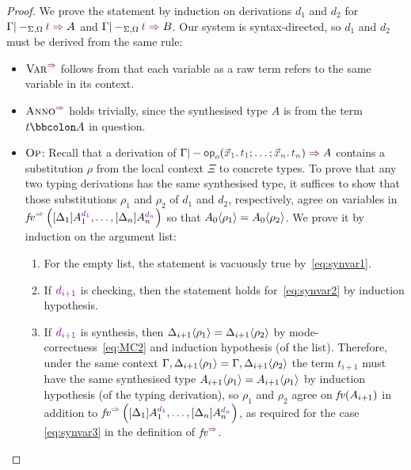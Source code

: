 \begin{proof}%
  We prove the statement by induction on derivations $d_1$ and $d_2$ for $\Gamma |-_{\Sigma, \Omega} \isTerm{t} \syn A$ and $\Gamma |-_{\Sigma, \Omega} \isTerm{t} \syn B$.
  Our system is syntax-directed, so $d_1$ and $d_2$ must be derived from the same rule: 
  \begin{itemize}
    \item $\SynRule{Var}$ follows from that each variable as a raw term refers to the same variable in its context.
    \item $\SynRule{Anno}$ holds trivially, since the synthesised type $A$ is from the term $t \annotate A$ in question.
    \item $\textnormal{\textsc{Op}}$: Recall that a derivation of\/ $\Gamma |- \tmOpts \syn A$ contains a substitution $\rho$ from the local context $\Xi$ to concrete types.
      To prove that any two typing derivations has the same synthesised type, it suffices to show that those substitutions $\rho_1$ and $\rho_2$ of $d_1$ and $d_2$, respectively, agree on variables in $\synvar\left(\biargs\right)$ so that ${A_0}\!\left<{\rho_1}\right> = {A_0}\!\left<{\rho_2}\right>$.
      We prove it by induction on the argument list:
      \begin{enumerate}
        \item For the empty list, the statement is vacuously true by~\eqref{eq:synvar1}.
        \item If $\dir{d_{i+1}}$ is checking, then the statement holds for~\eqref{eq:synvar2} by induction hypothesis.
        \item If $\dir{d_{i+1}}$ is synthesis, then ${\Delta_{i+1}}\!\left<{\rho_1}\right> = {\Delta_{i+1}}\!\left<{\rho_2}\right>$ by mode-correctness~\eqref{eq:MC2} and induction hypothesis (of the list).
          Therefore, under the same context $\Gamma, {\Delta_{i+1}}\!\left<{\rho_1}\right> = \Gamma, {\Delta_{i+1}}\!\left<{\rho_2}\right>$ the term $t_{i+1}$ must have the same synthesised type ${A_{i+1}}\!\left<{\rho_1}\right> = {A_{i+1}}\!\left<{\rho_1}\right>$ by induction hypothesis (of the typing derivation), so $\rho_1$ and $\rho_2$ agree on $\mathit{fv}(A_{i+1})$ in addition to $\synvar\left(\biargs\right)$, as required for the case \eqref{eq:synvar3} in the definition of $\synvar$.
      \end{enumerate}
  \end{itemize}
\end{proof}


